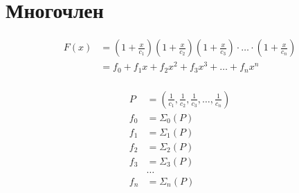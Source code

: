 
\section{Многочлен}

\begin{equation*} \begin{aligned}
F(x) &= 
\left(1 + \frac{x}{c_1} \right) 
\left(1 + \frac{x}{c_2} \right) 
\left(1 + \frac{x}{c_3} \right) 
\cdot \ldots \cdot
\left(1 + \frac{x}{c_n} \right) \\ &=
f_0 + f_1 x + f_2 x^2 + f_3 x^3 + \ldots + f_n x^n \\
\end{aligned} \end{equation*}

\begin{equation*} \begin{aligned}
P &=
\left(
\frac{1}{c_1},
\frac{1}{c_2},
\frac{1}{c_3},
{} \ldots,
\frac{1}{c_n}
\right) \\
f_0 &= \Sigma_0(P) \\ 
f_1 &= \Sigma_1(P) \\
f_2 &= \Sigma_2(P) \\
f_3 &= \Sigma_3(P) \\
&\ldots \\
f_n &= \Sigma_n(P) \\
\end{aligned} \end{equation*}